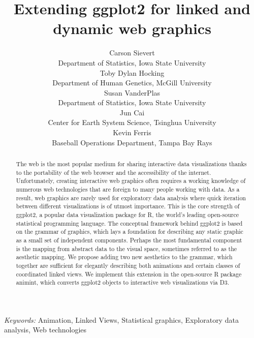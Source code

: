 \documentclass[12pt,]{article}
\theoremstyle{definition}
\theoremstyle{definition}
\theoremstyle{remark}
\begin{document}
\def\spacingset#1{\renewcommand{\baselinestretch}%
{#1}\small\normalsize} \spacingset{1}

\title{\bf Extending ggplot2 for linked and dynamic web graphics}
\author{
  Carson Sievert \\ 
  Department of Statistics, Iowa State University \\
  Toby Dylan Hocking \\ 
  Department of Human Genetics, McGill University \\
  Susan VanderPlas \\
  Department of Statistics, Iowa State University \\
  Jun Cai \\
  Center for Earth System Science, Tsinghua University\\
  Kevin Ferris \\
  Baseball Operations Department, Tampa Bay Rays
}
\maketitle

\bigskip
\begin{abstract}
The web is the most popular medium for sharing interactive data
visualizations thanks to the portability of the web browser and the
accessibility of the internet. Unfortunately, creating interactive web
graphics often requires a working knowledge of numerous web technologies
that are foreign to many people working with data. As a result, web
graphics are rarely used for exploratory data analysis where quick
iteration between different visualizations is of utmost importance. This
is the core strength of ggplot2, a popular data visualization package
for R, the world's leading open-source statistical programming language.
The conceptual framework behind ggplot2 is based on the grammar of
graphics, which lays a foundation for describing any static graphic as a
small set of independent components. Perhaps the most fundamental
component is the mapping from abstract data to the visual space,
sometimes referred to as the aesthetic mapping. We propose adding two
new aesthetics to the grammar, which together are sufficient for
elegantly describing both animations and certain classes of coordinated
linked views. We implement this extension in the open-source R package
animint, which converts ggplot2 objects to interactive web
visualizations via D3.
\end{abstract}

\noindent
{\it Keywords:}  Animation, Linked Views, Statistical graphics, Exploratory data
analysis, Web technologies
\vfill
\end{document}
